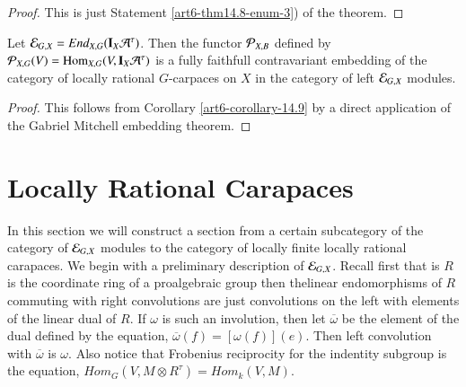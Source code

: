 \begin{proof}
This is just Statement \ref{art6-thm14.8-enum-3}) of the theorem.
\end{proof}

\begin{coro}\label{art6-corollary-14.10}
Let $\mathcal{E}_{G, X} = End_{X, G}(\mathbf{I}_{X} \mathcal{A}^{\tau})$. Then the functor $\mathcal{P}_{X, B}$ defined by $\mathcal{P}_{X, G}(V) = \operatorname{Hom}_{X, G}(V, \mathbf{I}_{X} \mathcal{A}^{\tau})$ is a fully faithfull contravariant embedding of the category of locally rational $G$-carpaces on $X$ in the category of left $\mathcal{E}_{G, X}$ modules.
\end{coro}

\begin{proof}
This follows from Corollary \ref{art6-corollary-14.9} by a direct application of the Gabriel Mitchell embedding theorem.
\end{proof}

\section{Locally Rational Carapaces}\label{art6-sec-15}

In this section we will construct a section from a certain subcategory of the category of $\mathcal{E}_{G, X}$ modules to the category of locally finite locally rational carapaces. We begin with a preliminary description of $\mathcal{E}_{G, X}$. Recall first that is $R$ is the coordinate ring of a proalgebraic group then thelinear endomorphisms of $R$ commuting with right convolutions are just convolutions on the left with elements of the linear dual of $R$. If $\omega$ is such an involution, then let $\overline{\omega}$ be the element of the dual defined by the equation, $\overline{\omega}(f) = [\omega(f)](e)$. Then left convolution with $\overline{\omega}$ is $\omega$. Also notice that Frobenius reciprocity for the indentity subgroup is the equation, $Hom_{G}(V, M \otimes R^{\tau}) = Hom_{k}(V, M)$.

